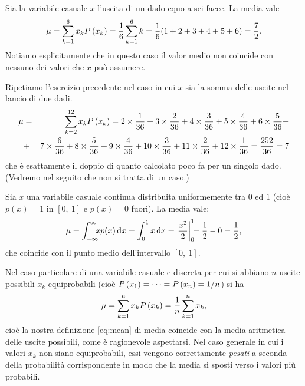 \begin{examplebox}
  \begin{example}\label{exp:media_dado}
    Sia la variabile casuale $x$ l'uscita di un dado equo a sei facce. La media
    vale
    \begin{align*}
      \mu = \sum_{k=1}^{6} x_k \displaystyle P\left(x_k\right) =
      \frac{1}{6} \sum_{k = 1}^{6} k =
      \frac{1}{6} (1 + 2 + 3 + 4 + 5 + 6) = \frac{7}{2}.
    \end{align*}
    Notiamo esplicitamente che in questo caso il valor medio non coincide con
    nessuno dei valori che $x$ può assumere.
  \end{example}

  \begin{example}\label{exp:media_due_dadi}
    Ripetiamo l'esercizio precedente nel caso in cui $x$ sia la somma delle
    uscite nel lancio di due dadi.
    \begin{eqnarray*}
      \mu &=& \displaystyle \sum_{k=2}^{12} x_k \displaystyle P\left(x_k\right) =
      2 \times \frac{1}{36} + 3 \times \frac{2}{36} +
      4 \times \frac{3}{36} + 5 \times \frac{4}{36} + 6 \times \frac{5}{36} +\\
      &+& \displaystyle 7 \times \frac{6}{36} + 8 \times \frac{5}{36} +
      9 \times \frac{4}{36} + 10 \times \frac{3}{36} + 11 \times \frac{2}{36} +
      12 \times \frac{1}{36} = \frac{252}{36} = 7
    \end{eqnarray*}
    che è esattamente il doppio di quanto calcolato poco fa per un
    singolo dado. (Vedremo nel seguito che non si tratta di un caso.)
  \end{example}

  \begin{example}\label{exp:media_dist_uniforme}
  Sia $x$ una variabile casuale continua distribuita uniformemente tra $0$ ed
  $1$ (cioè $p(x) = 1$ in $[0,~1]$ e $p(x) = 0$ fuori). La media vale:
  \begin{align*}
    \mu = \intinf x p(x)\diff = \int_{0}^{1} x \diff =
    \eval{\frac{x^2}{2}}{0}{1} = \frac{1}{2} - 0 = \frac{1}{2},
  \end{align*}
  che coincide con il punto medio dell'intervallo $[0,~1]$.
  \end{example}
\end{examplebox}

Nel caso particolare di una variabile casuale e discreta per cui si abbiano
$n$ uscite possibili $x_k$ equiprobabili (cioè
$\displaystyle P\left(x_1\right) = \cdots = \displaystyle P\left(x_n\right) = 1/n$) si ha
\begin{align*}
  \mu = \sum_{k=1}^n x_k\displaystyle P\left(x_k\right) = \frac{1}{n}\sum_{k=1}^n x_k,
\end{align*}
cioè la nostra definizione \eqref{eq:mean} di media coincide con la
media aritmetica delle uscite possibili, come è ragionevole aspettarsi.
Nel caso generale in cui i  valori $x_k$ non siano equiprobabili,
essi vengono correttamente \emph{pesati} a seconda della probabilità
corrispondente in modo che la media si sposti verso i valori più probabili.

